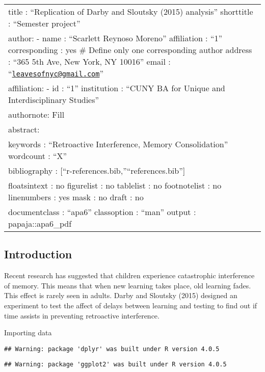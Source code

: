 \documentclass[
  english,
  man]{article}
\author{\phantom{0}}
\date{}
\affiliation{\phantom{0}}
\begin{document}
\begin{longtable}[]{@{}
  >{\raggedright\arraybackslash}p{}@{}}
\toprule
\endhead
title : ``Replication of Darby and Sloutsky (2015) analysis''
shorttitle : ``Semester project'' \\
author:
- name : ``Scarlett Reynoso Moreno''
affiliation : ``1''
corresponding : yes \# Define only one corresponding author
address : ``365 5th Ave, New York, NY 10016''
email : ``\href{mailto:leavesofnyc@gmail.com}{\nolinkurl{leavesofnyc@gmail.com}}'' \\
affiliation:
- id : ``1''
institution : ``CUNY BA for Unique and Interdisciplinary Studies'' \\
authornote: \textbar{}
Fill \\
abstract: \textbar{} \\
keywords : ``Retroactive Interference, Memory Consolidation''
wordcount : ``X'' \\
bibliography : {[}``r-references.bib,''``references.bib''{]} \\
floatsintext : no
figurelist : no
tablelist : no
footnotelist : no
linenumbers : yes
mask : no
draft : no \\
documentclass : ``apa6''
classoption : ``man''
output : papaja::apa6\_pdf \\
\bottomrule
\end{longtable}

\hypertarget{introduction}{%
\subsection{Introduction}\label{introduction}}

Recent research has suggested that children experience catastrophic interference of memory. This means that when new learning takes place, old learning fades. This effect is rarely seen in adults. Darby and Sloutsky (2015) designed an experiment to test the affect of delays between learning and testing to find out if time assists in preventing retroactive interference.

Importing data

\begin{verbatim}
## Warning: package 'dplyr' was built under R version 4.0.5
\end{verbatim}

\begin{verbatim}
## Warning: package 'ggplot2' was built under R version 4.0.5
\end{verbatim}
\end{document}
